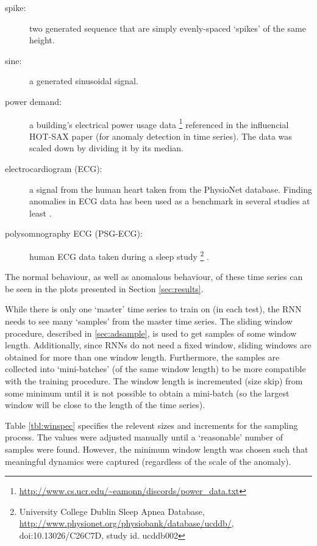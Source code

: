 \begin{description}

\item[spike:] two generated sequence that are simply evenly-spaced `spikes' of the same height.

\item[sine:] a generated sinusoidal signal.

\item[power demand:] a building's electrical power usage data
\footnote{\url{http://www.cs.ucr.edu/~eamonn/discords/power_data.txt}} referenced in the influencial HOT-SAX paper \cite{Keogh2005} (for anomaly detection in time series). The data was scaled down by dividing it by its median.

\item[electrocardiogram  (ECG):] a signal from the human heart taken from the PhysioNet \cite{PhysioNet} database. Finding anomalies in ECG data has been used as a benchmark in several studies at least \cite{Malhotra2015,Keogh2005,Cheboli2010,li2012dimensionality,Wei2005,Chuah2007}.

\item[polysomnography ECG (PSG-ECG):] human ECG data \cite{PhysioNet} taken during a sleep study%
\footnote{University College Dublin Sleep Apnea Database, \url{http://www.physionet.org/physiobank/database/ucddb/}, doi:10.13026/C26C7D, study id. ucddb002}%
.


\end{description}
\noindent
%
The normal behaviour, as well as anomalous behaviour, of these time series can be seen in the plots presented in Section \ref{sec:results}.%

While there is only one `master' time series to train on (in each test), the RNN needs to see many `samples' from the master time series.
%
The sliding window procedure, described in \ref{sec:adsample}, is used to get samples of some window length.
%
Additionally, since RNNs do not need a fixed window, sliding windows are obtained for more than one window length.
%
Furthermore, the samples are collected into `mini-batches' (of the same window length) to be more compatible with the training procedure.
%
The window length is incremented (size skip) from some minimum until it is not possible to obtain a mini-batch (so the largest window will be close to the length of the time series).


Table \ref{tbl:winspec} specifies the relevent sizes and increments for the sampling process.
%
The values were adjusted manually until a `reasonable' number of samples were found.
%
However, the minimum window length was chosen such that meaningful dynamics were captured (regardless of the scale of the anomaly).

